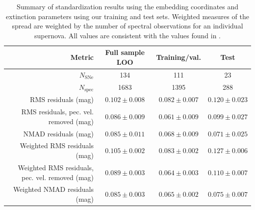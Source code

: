 \begin{table}
    \centering
    \begin{tabular}{rccc}\toprule
        Metric & Full sample LOO & Training/val. & Test\\\midrule
        $N_\textrm{SNe}$ & 134 & 111 & 23\\
        $N_\textrm{spec}$ & 1683 & 1395 & 288\\\midrule
        RMS residuals (mag) & $0.102 \pm 0.008$ & $0.082\pm 0.007$ & $0.120\pm 0.023$ \\
        RMS residuals, pec. vel. removed (mag) & $0.086\pm 0.009$ & $0.061\pm 0.009$ & $0.099\pm 0.027$\\
        NMAD residuals (mag) & $0.085 \pm 0.011$ & $0.068\pm 0.009$ & $0.071\pm 0.025$ \\\midrule
        Weighted RMS residuals (mag) & $0.105 \pm 0.002$ & $0.083\pm 0.002$ & $0.127\pm 0.006$ \\
        Weighted RMS residuals, pec. vel. removed (mag) & $0.089\pm 0.003$ & $0.064\pm 0.003$ & $0.110\pm 0.007$\\
        Weighted NMAD residuals (mag) & $0.085 \pm 0.003$ & $0.065\pm 0.002$ & $0.075\pm 0.007$\\
    \bottomrule
    \end{tabular}
    \caption{Summary of standardization results using the  embedding coordinates and extinction parameters using our training and test sets. Weighted measures of the spread are weighted by the number of spectral observations for an individual supernova. All values are consistent with the values found in .}
    \label{tab:standardization_test_results}
\end{table}

